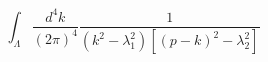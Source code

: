 \begin{equation}
\int_{\Lambda }\frac{d^{4}k}{(2\pi )^{4}}\frac{1}{(k^{2}-\lambda
_{1}^{2})[(p-k)^{2}-\lambda _{2}^{2}]}
\end{equation}

